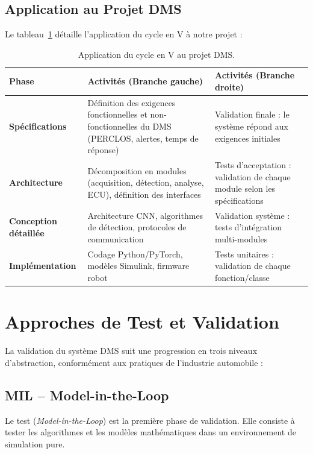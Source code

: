 \subsection{Application au Projet DMS}

Le tableau~\ref{tab:cycle_v_dms} détaille l'application du cycle en V à notre projet :

\begin{table}[H]
\centering
\caption{Application du cycle en V au projet DMS.}
\label{tab:cycle_v_dms}
\renewcommand{\arraystretch}{1.4}
\begin{tabularx}{\textwidth}{|>{\bfseries\small}p{2.5cm}|X|X|}
\hline
\rowcolor{stellantisblue!15}
\textbf{Phase} & \textbf{Activités (Branche gauche)} & \textbf{Activités (Branche droite)} \\
\hline
Spécifications & Définition des exigences fonctionnelles et non-fonctionnelles du DMS (PERCLOS, alertes, temps de réponse) & Validation finale : le système répond aux exigences initiales \\
\hline
Architecture & Décomposition en modules (acquisition, détection, analyse, ECU), définition des interfaces & Tests d'acceptation : validation de chaque module selon les spécifications \\
\hline
Conception détaillée & Architecture CNN, algorithmes de détection, protocoles de communication & Validation système : tests d'intégration multi-modules \\
\hline
Implémentation & Codage Python/PyTorch, modèles Simulink, firmware robot & Tests unitaires : validation de chaque fonction/classe \\
\hline
\end{tabularx}
\end{table}

\section{Approches de Test et Validation}

La validation du système DMS suit une progression en trois niveaux d'abstraction, conformément aux pratiques de l'industrie automobile \cite{expleo2024} :

\subsection{MIL -- Model-in-the-Loop}

Le test  (\textit{Model-in-the-Loop}) est la première phase de validation. Elle consiste à tester les algorithmes et les modèles mathématiques dans un environnement de simulation pure.

